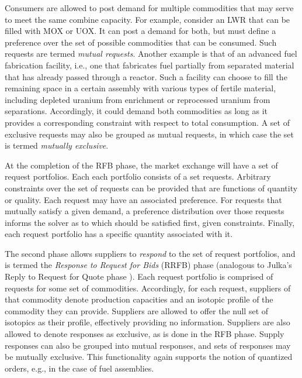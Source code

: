 Consumers are allowed to post demand for multiple commodities that may serve to
meet the same combine capacity. For example, consider an LWR that can be filled
with MOX or UOX. It can post a demand for both, but must define a preference
over the set of possible commodities that can be consumed. Such requests are
termed \textit{mutual requests}. Another example is that of an advanced fuel
fabrication facility, i.e., one that fabricates fuel partially from separated
material that has already passed through a reactor. Such a facility can choose
to fill the remaining space in a certain assembly with various types of fertile
material, including depleted uranium from enrichment or reprocessed uranium from
separations. Accordingly, it could demand both commodities as long as it
provides a corresponding constraint with respect to total consumption. A set of
exclusive requests may also be grouped as mutual requests, in which case the set
is termed \textit{mutually exclusive}.

At the completion of the RFB phase, the market exchange will have a set of
request portfolios. Each each portfolio consists of a set requests. Arbitrary
constraints over the set of requests can be provided that are functions of
quantity or quality.  Each request may have an associated preference. For
requests that mutually satisfy a given demand, a preference distribution over
those requests informs the solver as to which should be satisfied first, given
constraints. Finally, each request portfolio has a specific quantity associated
with it.

The second phase allows suppliers to \textit{respond} to the set of request
portfolios, and is termed the \textit{Response to Request for Bids} (RRFB) phase
(analogous to Julka's Reply to Request for Quote phase
\cite{julka_agent-based_2002}). Each request portfolio is comprised of requests
for some set of commodities. Accordingly, for each request, suppliers of that
commodity denote production capacities and an isotopic profile of the commodity
they can provide. Suppliers are allowed to offer the null set of isotopics as
their profile, effectively providing no information. Suppliers are also allowed
to denote responses as exclusive, as is done in the RFB phase. Supply responses
can also be grouped into mutual responses, and sets of responses may be mutually
exclusive. This functionality again supports the notion of quantized orders,
e.g., in the case of fuel assemblies. 

